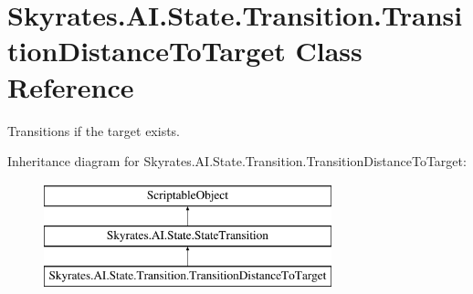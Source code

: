 \hypertarget{class_skyrates_1_1_a_i_1_1_state_1_1_transition_1_1_transition_distance_to_target}{\section{Skyrates.\-A\-I.\-State.\-Transition.\-Transition\-Distance\-To\-Target Class Reference}
\label{class_skyrates_1_1_a_i_1_1_state_1_1_transition_1_1_transition_distance_to_target}
}


Transitions if the target exists.  


Inheritance diagram for Skyrates.\-A\-I.\-State.\-Transition.\-Transition\-Distance\-To\-Target\-:\begin{figure}[H]
\begin{center}
\leavevmode
\includegraphics[height=3.000000cm]{class_skyrates_1_1_a_i_1_1_state_1_1_transition_1_1_transition_distance_to_target}
\end{center}
\end{figure}
